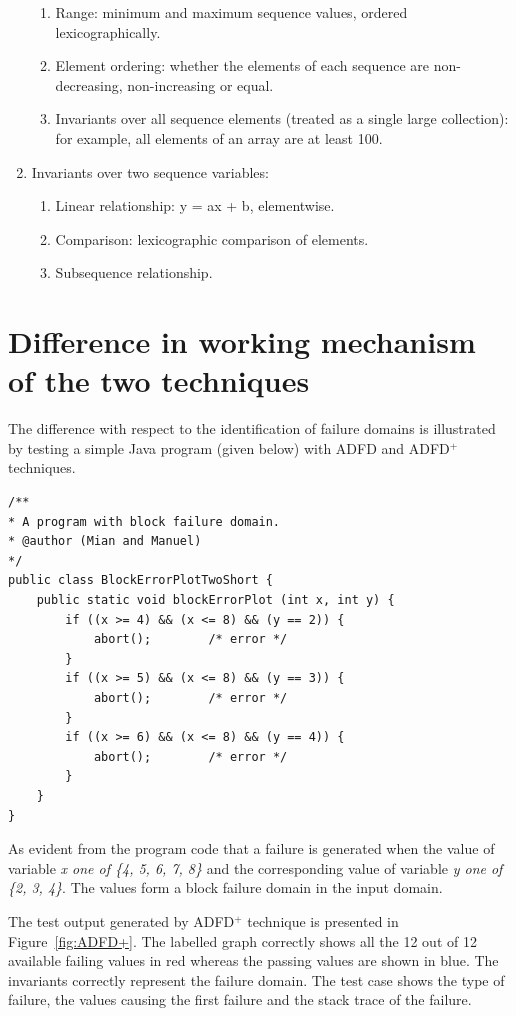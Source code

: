 \begin{enumerate}
\begin{enumerate}
	\item Range: minimum and maximum sequence values, ordered lexicographically. 
	\item Element ordering: whether the elements of each sequence are non-decreasing, non-increasing or equal.
	\item Invariants over all sequence elements (treated as a single large collection): for example, all elements of an array are at least 100.
	\end{enumerate}
\item Invariants over two sequence variables: 
	\begin{enumerate}
	\item Linear relationship: y = ax + b, elementwise. 
	\item Comparison: lexicographic comparison of elements. 
	\item Subsequence relationship.
	\end{enumerate}
\end{enumerate}








\section{Difference in working mechanism of the two techniques}
The difference with respect to the identification of failure domains is illustrated by testing a simple Java program (given below) with ADFD and ADFD$^+$ techniques. 
\bigskip
\begin{lstlisting}
/** 
* A program with block failure domain.
* @author (Mian and Manuel)
*/
public class BlockErrorPlotTwoShort {
	public static void blockErrorPlot (int x, int y) {
		if ((x >= 4) && (x <= 8) && (y == 2)) { 
			abort();		/* error */
		}
		if ((x >= 5) && (x <= 8) && (y == 3)) { 
			abort();		/* error */
		}
		if ((x >= 6) && (x <= 8) && (y == 4)) { 
			abort();		/* error */
		}
	}
}
\end{lstlisting}
\bigskip


As evident from the program code that a failure is generated when the value of variable \textit{x one of \{4, 5, 6, 7, 8\}} and the corresponding value of variable \textit{y one of \{2, 3, 4\}}. The values form a block failure domain in the input domain.

The test output generated by ADFD$^+$ technique is presented in Figure~\ref{fig:ADFD+}. The labelled graph correctly shows all the 12 out of 12 available failing values in red whereas the passing values are shown in blue. The invariants correctly represent the failure domain. The test case shows the type of failure, the values causing the first failure and the stack trace of the failure.

